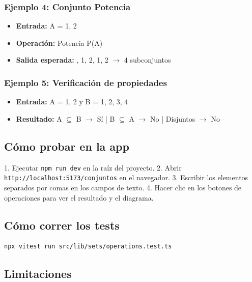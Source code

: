 \documentclass[11pt,a4paper,openany]{book}
\begin{document}
\subsubsection{Ejemplo 4: Conjunto Potencia}
\begin{itemize}[leftmargin=*]
\item \textbf{Entrada:} A = {1, 2}
\item \textbf{Operación:} Potencia P(A)
\item \textbf{Salida esperada:} { {}, {1}, {2}, {1, 2} } $ \to $ 4 subconjuntos
\end{itemize}

\subsubsection{Ejemplo 5: Verificación de propiedades}
\begin{itemize}[leftmargin=*]
\item \textbf{Entrada:} A = {1, 2} y B = {1, 2, 3, 4}
\item \textbf{Resultado:} A $ \subseteq $ B $ \to $  Sí | B $ \subseteq $ A $ \to $  No | Disjuntos $ \to $  No
\end{itemize}

\hrulefill

\subsection{Cómo probar en la app}

1. Ejecutar \texttt{npm run dev} en la raíz del proyecto.
2. Abrir \texttt{http://localhost:5173/conjuntos} en el navegador.
3. Escribir los elementos separados por comas en los campos de texto.
4. Hacer clic en los botones de operaciones para ver el resultado y el diagrama.

\subsection{Cómo correr los tests}

\begin{lstlisting}[language={},basicstyle=\ttfamily\scriptsize]
npx vitest run src/lib/sets/operations.test.ts
\end{lstlisting}

\hrulefill

\subsection{Limitaciones}
\end{document}
